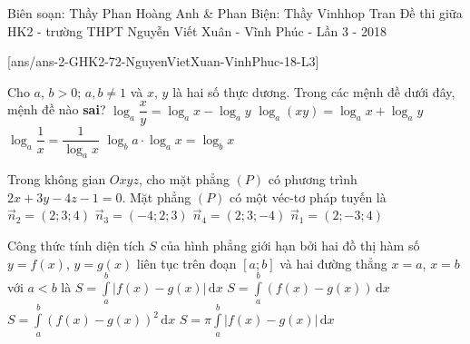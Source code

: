 
\begin{name}
		{Biên soạn: Thầy Phan Hoàng Anh \& Phan Biện: Thầy Vinhhop Tran}
		{Đề thi giữa HK2 - trường THPT Nguyễn Viết Xuân - Vĩnh Phúc - Lần 3 - 2018}
	\end{name}
\setcounter{ex}{0}
[ans/ans-2-GHK2-72-NguyenVietXuan-VinhPhuc-18-L3]

\begin{ex}%
	Cho $a$, $b>0$; $a,b\ne1$ và $x$, $y$ là hai số thực dương. Trong các mệnh đề dưới đây, mệnh đề nào \textbf{sai}? 
	\choice
	{$\log_a\dfrac{x}{y}=\log_ax-\log_ay$}
	{$\log_a(xy)=\log_ax+\log_ay$}
	{\True $\log_a\dfrac{1}{x}=\dfrac{1}{\log_ax}$}
	{$\log_ba\cdot\log_ax=\log_bx$}
\end{ex}
\begin{ex}%
	Trong không gian $Oxyz$, cho mặt phẳng $(P)$ có phương trình $2x+3y-4z-1=0$. Mặt phẳng $(P)$ có một véc-tơ pháp tuyến là
	\choice
	{$\vec{n}_2=(2;3;4)$}
	{$\vec{n}_3=(-4;2;3)$}
	{\True $\vec{n}_4=(2;3;-4)$}
	{$\vec{n}_1=(2;-3;4)$}
\end{ex}
\begin{ex}%
{}
\end{ex}
\begin{ex}%
	Công thức tính diện tích $S$ của hình phẳng giới hạn bởi hai đồ thị hàm số $y=f(x)$, $y=g(x)$ liên tục trên đoạn $[a;b]$ và hai đường thẳng $x=a$, $x=b$ với $a<b$ là
	\choice
	{\True $S=\displaystyle\int\limits_a^b|f(x)-g(x)|\mathrm{\,d}x$}
	{$S=\displaystyle\int\limits_a^b(f(x)-g(x))\mathrm{\,d}x$}
	{$S=\displaystyle\int\limits_a^b(f(x)-g(x))^2\mathrm{\,d}x$}
	{$S=\pi\displaystyle\int\limits_a^b|f(x)-g(x)|\mathrm{\,d}x$}
\end{ex}
